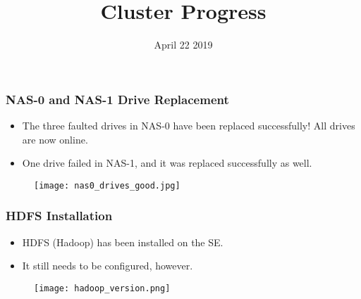 \documentclass{beamer}
\title{Cluster Progress}
\date{April 22 2019}
\begin{document}

\begin{frame}
  \maketitle
\end{frame}



\begin{frame}
  \frametitle{NAS-0 and NAS-1 Drive Replacement}

  \begin{itemize}
  \item The three faulted drives in NAS-0 have been replaced successfully! All drives are now online.
  \item One drive failed in NAS-1, and it was replaced successfully as well.
  \end{itemize}

  \begin{figure}[H]
    \begin{center}
      \texttt{[image: nas0\_drives\_good.jpg]}
    \end{center}
  \end{figure}

\end{frame}

\begin{frame}
  \frametitle{HDFS Installation}

  \begin{itemize}
  \item HDFS (Hadoop) has been installed on the SE.
  \item It still needs to be configured, however.
  \end{itemize}

  \begin{figure}[H]
    \begin{center}
      \texttt{[image: hadoop\_version.png]}
    \end{center}
   \end{figure}

\end{frame}
\end{document}
